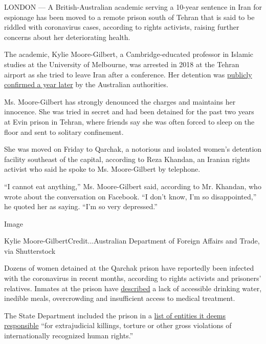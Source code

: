 LONDON --- A British-Australian academic serving a 10-year sentence in
Iran for espionage has been moved to a remote prison south of Tehran
that is said to be riddled with coronavirus cases, according to rights
activists, raising further concerns about her deteriorating health.

The academic, Kylie Moore-Gilbert, a Cambridge-educated professor in
Islamic studies at the University of Melbourne, was arrested in 2018 at
the Tehran airport as she tried to leave Iran after a conference. Her
detention was
\href{https://www.nytimes.com/2019/09/11/world/australia/australians-detained-iran.html?rref=collection\%2Fbyline\%2Fmegan-specia\&action=click\&contentCollection=undefined\&region=stream\&module=stream_unit\&version=latest\&contentPlacement=1\&pgtype=collection}{publicly
confirmed a year later} by the Australian authorities.

Ms. Moore-Gilbert has strongly denounced the charges and maintains her
innocence. She was tried in secret and had been detained for the past
two years at Evin prison in Tehran, where friends say she was often
forced to sleep on the floor and sent to solitary confinement.

She was moved on Friday to Qarchak, a notorious and isolated women's
detention facility southeast of the capital, according to Reza Khandan,
an Iranian rights activist who said he spoke to Ms. Moore-Gilbert by
telephone.

``I cannot eat anything,'' Ms. Moore-Gilbert said, according to Mr.
Khandan, who wrote about the conversation on Facebook. ``I don't know,
I'm so disappointed,'' he quoted her as saying. ``I'm so very
depressed.''

Image

Kylie Moore-GilbertCredit...Australian Department of Foreign Affairs and
Trade, via Shutterstock

Dozens of women detained at the Qarchak prison have reportedly been
infected with the coronavirus in recent months, according to rights
activists and prisoners' relatives. Inmates at the prison have
\href{https://iranhumanrights.org/2019/08/prisoners-in-irans-gharchak-prison-for-women-protest-inhumane-living-conditions/}{described}
a lack of accessible drinking water, inedible meals, overcrowding and
insufficient access to medical treatment.

The State Department included the prison in a
\href{https://www.state.gov/report-to-congress-list-of-persons-who-are-responsible-for-or-complicit-in-certain-human-rights-abuses-in-iran/}{list
of entities it deems responsible} ``for extrajudicial killings, torture
or other gross violations of internationally recognized human rights.''

